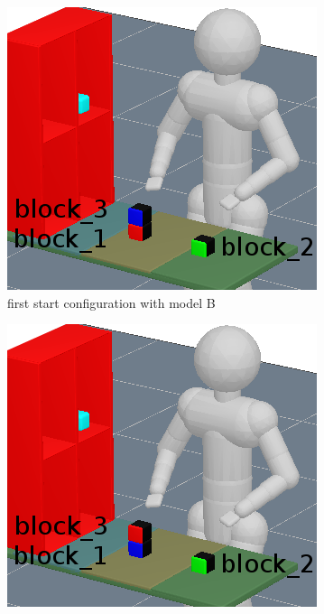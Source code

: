 \documentclass[conference]{IEEEtran}
\begin{document}
\begin{figure}
\centering
        \begin{subfigure}[t]{0.15\textwidth}
            \includegraphics[width=\textwidth]{images/start-a.png}
            \caption{first start configuration with model B}
        \label{fig:start-1}
        \end{subfigure}
        \hfill
        \begin{subfigure}[t]{0.15\textwidth}
            \includegraphics[width=\textwidth]{images/start-b.png}

\end{subfigure}
\end{figure}
\end{document}
